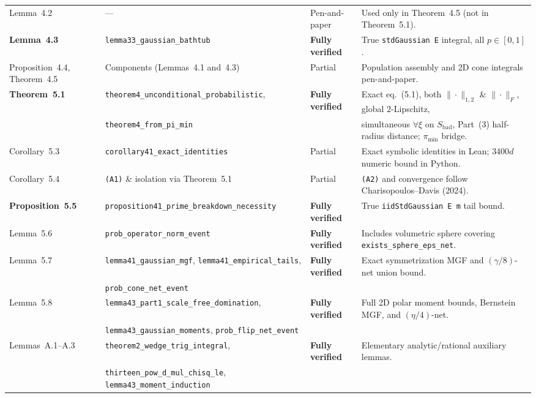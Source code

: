 \documentclass[11pt]{article}
\newcommand{\Fnorm}[1]{\|#1\|_F}
\newcommand{\Lonenorm}[1]{\|#1\|_{1,2}}
\begin{document}
\begin{table}[htbp]
{\begin{tabular}{@{}llll@{}}
    Lemma~4.2 & --- & Pen-and-paper & Used only in Theorem~4.5 (not in Theorem~5.1). \\
    \textbf{Lemma~4.3} & \texttt{lemma33\_gaussian\_bathtub} & \textbf{Fully verified} & True \texttt{stdGaussian E} integral, all $p \in [0, 1]$. \\
    Proposition~4.4, Theorem~4.5 & Components (Lemmas~4.1 and~4.3) & Partial & Population assembly and 2D cone integrals pen-and-paper. \\
    \textbf{Theorem~5.1} & \texttt{theorem4\_unconditional\_probabilistic}, & \textbf{Fully verified} & Exact eq.~(5.1), both $\Lonenorm{\cdot}$ \& $\Fnorm{\cdot}$, global $2$-Lipschitz, \\
      & \texttt{theorem4\_from\_pi\_min} & & simultaneous $\forall \xi$ on $S_{\mathrm{bad}}$, Part~(3) half-radius distance; $\pi_{\min}$ bridge. \\
    Corollary~5.3 & \texttt{corollary41\_exact\_identities} & Partial & Exact symbolic identities in Lean; $3400d$ numeric bound in Python. \\
    Corollary~5.4 & \texttt{(A1)} \& isolation via Theorem~5.1 & Partial & \texttt{(A2)} and convergence follow Charisopoulos--Davis (2024). \\
    \textbf{Proposition~5.5} & \texttt{proposition41\_prime\_breakdown\_necessity} & \textbf{Fully verified} & True \texttt{iidStdGaussian E m} tail bound. \\
    Lemma~5.6 & \texttt{prob\_operator\_norm\_event} & \textbf{Fully verified} & Includes volumetric sphere covering \texttt{exists\_sphere\_eps\_net}. \\
    Lemma~5.7 & \texttt{lemma41\_gaussian\_mgf}, \texttt{lemma41\_empirical\_tails}, & \textbf{Fully verified} & Exact symmetrization MGF and $(\gamma/8)$-net union bound. \\
      & \texttt{prob\_cone\_net\_event} & & \\
    Lemma~5.8 & \texttt{lemma43\_part1\_scale\_free\_domination}, & \textbf{Fully verified} & Full 2D polar moment bounds, Bernstein MGF, and $(\eta/4)$-net. \\
      & \texttt{lemma43\_gaussian\_moments}, \texttt{prob\_flip\_net\_event} & & \\
    Lemmas~A.1--A.3 & \texttt{theorem2\_wedge\_trig\_integral}, & \textbf{Fully verified} & Elementary analytic/rational auxiliary lemmas. \\
      & \texttt{thirteen\_pow\_d\_mul\_chisq\_le}, \texttt{lemma43\_moment\_induction} & & \\
    \bottomrule
  \end{tabular}}
\end{table}
\end{document}
